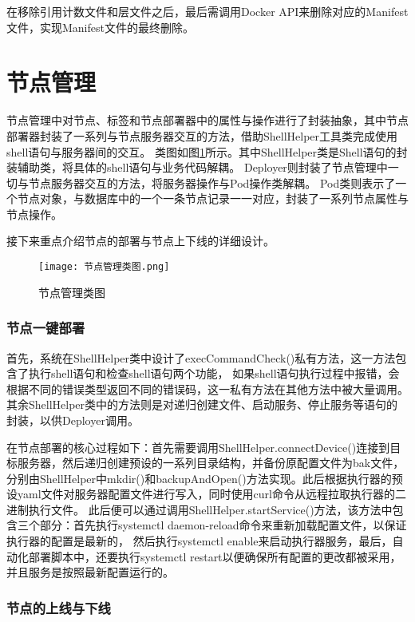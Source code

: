 在移除引用计数文件和层文件之后，最后需调用Docker API来删除对应的Manifest文件，实现Manifest文件的最终删除。


\section{节点管理}
节点管理中对节点、标签和节点部署器中的属性与操作进行了封装抽象，其中节点部署器封装了一系列与节点服务器交互的方法，借助ShellHelper工具类完成使用shell语句与服务器间的交互。
类图如图\ref{fig:节点管理类图}所示。其中ShellHelper类是Shell语句的封装辅助类，将具体的shell语句与业务代码解耦。
Deployer则封装了节点管理中一切与节点服务器交互的方法，将服务器操作与Pod操作类解耦。
Pod类则表示了一个节点对象，与数据库中的一个一条节点记录一一对应，封装了一系列节点属性与节点操作。

接下来重点介绍节点的部署与节点上下线的详细设计。

\begin{figure}[h]
  \centering
  \texttt{[image: 节点管理类图.png]}
  \caption{节点管理类图}
  \label{fig:节点管理类图}
\end{figure}

\subsubsection{节点一键部署}
首先，系统在ShellHelper类中设计了execCommandCheck()私有方法，这一方法包含了执行shell语句和检查shell语句两个功能，
如果shell语句执行过程中报错，会根据不同的错误类型返回不同的错误码，这一私有方法在其他方法中被大量调用。
其余ShellHelper类中的方法则是对递归创建文件、启动服务、停止服务等语句的封装，以供Deployer调用。

在节点部署的核心过程如下：首先需要调用ShellHelper.connectDevice()连接到目标服务器，然后递归创建预设的一系列目录结构，并备份原配置文件为bak文件，
分别由ShellHelper中mkdir()和backupAndOpen()方法实现。此后根据执行器的预设yaml文件对服务器配置文件进行写入，同时使用curl命令从远程拉取执行器的二进制执行文件。
此后便可以通过调用ShellHelper.startService()方法，该方法中包含三个部分：首先执行systemctl daemon-reload命令来重新加载配置文件，以保证执行器的配置是最新的，
然后执行systemctl enable来启动执行器服务，最后，自动化部署脚本中，还要执行systemctl restart以便确保所有配置的更改都被采用，并且服务是按照最新配置运行的。

\subsubsection{节点的上线与下线}

